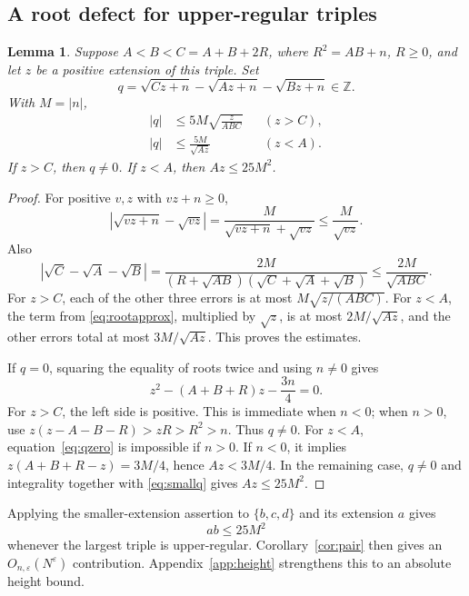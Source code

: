 \documentclass[11pt,a4paper]{article}
\numberwithin{equation}{section}
\newtheorem{lemma}[theorem]{Lemma}
\theoremstyle{remark}
\newcommand{\Z}{\mathbb Z}
\newcommand{\eps}{\varepsilon}
\begin{document}
\subsection{A root defect for upper-regular triples}
\begin{lemma}\label{lem:defect}
Suppose $A<B<C=A+B+2R$, where $R^2=AB+n$, $R\ge0$, and let $z$ be a positive extension of this triple. Set
\[
q=\sqrt{Cz+n}-\sqrt{Az+n}-\sqrt{Bz+n}\in\Z.
\]
With $M=|n|$,
\begin{align}
|q|&\le5M\sqrt{\frac{z}{ABC}}&& (z>C),\label{eq:largeq}\\
|q|&\le\frac{5M}{\sqrt{Az}}&& (z<A).\label{eq:smallq}
\end{align}
If $z>C$, then $q\ne0$. If $z<A$, then $Az\le25M^2$.
\end{lemma}
\begin{proof}
For positive $v,z$ with $vz+n\ge0$,
\[
\left|\sqrt{vz+n}-\sqrt{vz}\right|
=\frac{M}{\sqrt{vz+n}+\sqrt{vz}}\le\frac{M}{\sqrt{vz}}.
\]
Also
\begin{equation}\label{eq:rootapprox}
\left|\sqrt C-\sqrt A-\sqrt B\right|
=\frac{2M}{(R+\sqrt{AB})(\sqrt C+\sqrt A+\sqrt B)}
\le\frac{2M}{\sqrt{ABC}}.
\end{equation}
For $z>C$, each of the other three errors is at most $M\sqrt{z/(ABC)}$. For $z<A$, the term from \eqref{eq:rootapprox}, multiplied by $\sqrt z$, is at most $2M/\sqrt{Az}$, and the other errors total at most $3M/\sqrt{Az}$. This proves the estimates.

If $q=0$, squaring the equality of roots twice and using $n\ne0$ gives
\begin{equation}\label{eq:qzero}
z^2-(A+B+R)z-\frac{3n}{4}=0.
\end{equation}
For $z>C$, the left side is positive. This is immediate when $n<0$; when $n>0$, use $z(z-A-B-R)>zR>R^2>n$. Thus $q\ne0$.
For $z<A$, equation~\eqref{eq:qzero} is impossible if $n>0$. If $n<0$, it implies $z(A+B+R-z)=3M/4$, hence $Az<3M/4$. In the remaining case, $q\ne0$ and integrality together with \eqref{eq:smallq} gives $Az\le25M^2$.
\end{proof}

Applying the smaller-extension assertion to $\{b,c,d\}$ and its extension $a$ gives
\begin{equation}\label{eq:absmall}
ab\le25M^2
\end{equation}
whenever the largest triple is upper-regular. Corollary~\ref{cor:pair} then gives an $O_{n,\eps}(N^\eps)$ contribution. Appendix~\ref{app:height} strengthens this to an absolute height bound.
\end{document}
